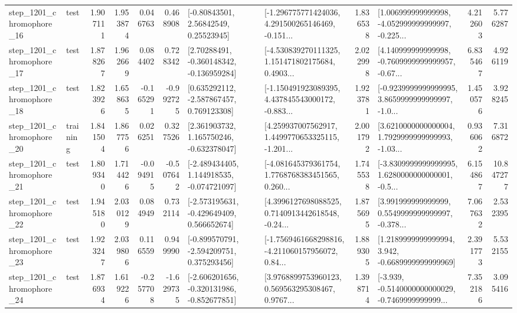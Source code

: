 \begin{tabular}{llrrrrllrlrr}
 step\_1201\_chromophore\_16 &      test &      1.907111 &    1.953874 &      0.046763 &  0.468908 &       [-0.80843501, 2.56842549, 0.25523945] &  [-1.296775771424036, 4.291500265146469, -0.151... &       1.836538 &  [1.006999999999998, -4.052999999999997, -0.225... &            4.212603 &          5.776287 \\
 step\_1201\_chromophore\_17 &      test &      1.878267 &    1.962669 &      0.084402 &  0.728342 &    [2.70288491, -0.360148342, -0.136959284] &  [-4.530839270111325, 1.151471802175684, 0.4903... &       2.022998 &  [4.140999999999998, -0.7609999999999957, -0.67... &            6.835467 &          4.926119 \\
 step\_1201\_chromophore\_18 &      test &      1.823926 &    1.658635 &     -0.165291 & -0.992725 &    [0.635292112, -2.587867457, 0.769123308] &  [-1.150491923089395, 4.437845543000172, -0.883... &       1.923781 &  [-0.9239999999999995, 3.8659999999999997, -1.0... &            1.450576 &          3.928245 \\
 step\_1201\_chromophore\_20 &  training &      1.841504 &    1.867756 &      0.026251 &  0.327526 &    [2.361903732, 1.165750246, -0.632378047] &  [4.259937007562917, 1.4499770653325115, -1.201... &       2.001792 &  [3.6210000000000004, 1.7929999999999993, -1.03... &            0.936062 &          7.316872 \\
 step\_1201\_chromophore\_21 &      test &      1.809340 &    1.714426 &     -0.094915 & -0.507642 &   [-2.489434405, 1.144918535, -0.074721097] &  [-4.081645379361754, 1.7768768383451565, 0.260... &       1.745538 &  [-3.8309999999999995, 1.6280000000000001, -0.5... &            6.154867 &         10.847277 \\
 step\_1201\_chromophore\_22 &      test &      1.945180 &    2.030129 &      0.084949 &  0.732114 &   [-2.573195631, -0.429649409, 0.566652674] &  [4.3996127698088525, 0.7140913442618548, -0.24... &       1.875695 &  [3.991999999999999, 0.5549999999999997, -0.378... &            7.067632 &          2.532395 \\
 step\_1201\_chromophore\_23 &      test &      1.923247 &    2.039806 &      0.116559 &  0.949990 &   [-0.899570791, -2.594209751, 0.375293456] &  [-1.7569461668298816, -4.211060157956072, 0.84... &       1.889305 &   [1.2189999999999994, 3.942, -0.6689999999999969] &            2.391773 &          5.532155 \\
 step\_1201\_chromophore\_24 &      test &      1.876934 &    1.619226 &     -0.257708 & -1.629735 &  [-2.606201656, -0.320131986, -0.852677851] &  [3.9768899753960123, 0.569563295308467, 0.9767... &       1.398714 &  [-3.939, -0.5140000000000029, -0.7469999999999... &            7.352186 &          3.095416 \\

\end{tabular}
